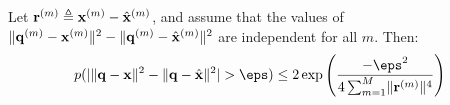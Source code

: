 \begin{lemma}
Let $\mathbf{r}^{(m)} \triangleq \mathbf{x}^{(m)} - \hat{\mathbf{x}}^{(m)}$, and assume that the values of $\lVert\mathbf{q}^{(m)} - \mathbf{x}^{(m)} \rVert^2 - \lVert\mathbf{q}^{(m)} - \hat{\mathbf{x}}^{(m)} \rVert^2$ are independent for all $m$. Then: %
\begin{align} \label{eq:l2_indep}
    p(\abs{ \norm{\q - \x}^2 - \norm{\q - \xhat}^2 } > \eps) \le
        2\exp \left( \frac{-\eps^2}{
            4 \sum_{m=1}^M \norm{\r^{(m)}}^4
        }\right)
\end{align}
\end{lemma}
